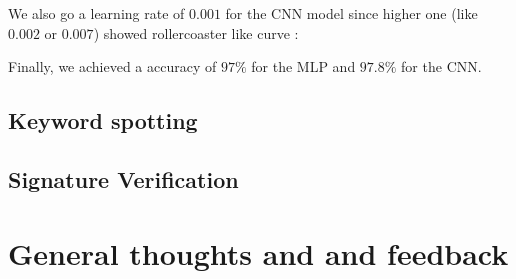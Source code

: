 \documentclass[a4paper,11pt]{report}
\begin{document}
We also go a learning rate of $0.001$ for the CNN model since higher one (like
$0.002$ or $0.007$) showed rollercoaster like curve :

\vspace*{0.2cm}

\begin{minipage}{0.49\textwidth}
  \begin{center}
  \end{center}
\end{minipage}
\begin{minipage}{0.49\textwidth}
Finally, we achieved a accuracy of $97\%$ for the MLP and $97.8\%$ for the CNN.
\end{minipage}

\subsection*{Keyword spotting}

\subsection*{Signature Verification}

\section*{General thoughts and and feedback}
\end{document}
